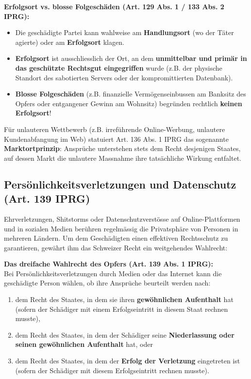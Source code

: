 \begin{theorem}
    \textbf{Erfolgsort vs. blosse Folgeschäden (Art. 129 Abs. 1 / 133 Abs. 2 IPRG):}
    \begin{itemize}
        \item Die geschädigte Partei kann wahlweise am \textbf{Handlungsort} (wo der Täter agierte) oder am \textbf{Erfolgsort} klagen.
        \item \textbf{Erfolgsort} ist ausschliesslich der Ort, an dem \textbf{unmittelbar und primär in das geschützte Rechtsgut eingegriffen} wurde (z.B. der physische Standort des sabotierten Servers oder der kompromittierten Datenbank).
        \item \textbf{Blosse Folgeschäden} (z.B. finanzielle Vermögenseinbussen am Banksitz des Opfers oder entgangener Gewinn am Wohnsitz) begründen rechtlich \textbf{keinen Erfolgsort}!
    \end{itemize}
\end{theorem}

Für unlauteren Wettbewerb (z.B. irreführende Online-Werbung, unlautere Kundenabfangung im Web) statuiert Art. 136 Abs. 1 IPRG das sogenannte \textbf{Marktortprinzip}: Ansprüche unterstehen stets dem Recht desjenigen Staates, auf dessen Markt die unlautere Massnahme ihre tatsächliche Wirkung entfaltet.

\subsection{Persönlichkeitsverletzungen und Datenschutz (Art. 139 IPRG)}

Ehrverletzungen, Shitstorms oder Datenschutzverstösse auf Online-Plattformen und in sozialen Medien berühren regelmässig die Privatsphäre von Personen in mehreren Ländern. Um dem Geschädigten einen effektiven Rechtsschutz zu garantieren, gewährt ihm das Schweizer Recht ein weitgehendes Wahlrecht:

\begin{definition}
    \textbf{Das dreifache Wahlrecht des Opfers (Art. 139 Abs. 1 IPRG):} \\
    Bei Persönlichkeitsverletzungen durch Medien oder das Internet kann die geschädigte Person wählen, ob ihre Ansprüche beurteilt werden nach:
    \begin{enumerate}
        \item dem Recht des Staates, in dem sie ihren \textbf{gewöhnlichen Aufenthalt} hat (sofern der Schädiger mit einem Erfolgseintritt in diesem Staat rechnen musste),
        \item dem Recht des Staates, in dem der Schädiger seine \textbf{Niederlassung oder seinen gewöhnlichen Aufenthalt} hat, oder
        \item dem Recht des Staates, in dem der \textbf{Erfolg der Verletzung} eingetreten ist (sofern der Schädiger mit diesem Erfolgseintritt rechnen musste).
    \end{enumerate}
\end{definition}

